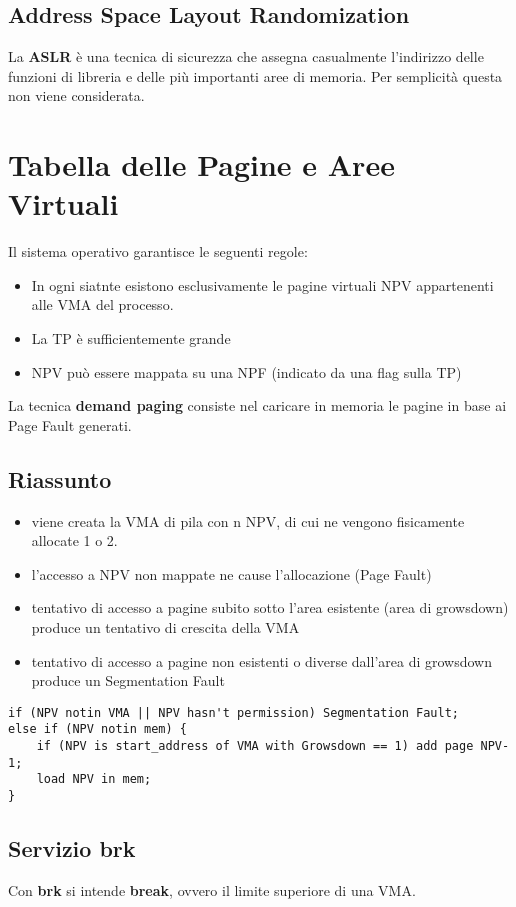 \documentclass[12pt, a4paper]{report}
\begin{document}
\subsection{Address Space Layout Randomization}
La \textbf{ASLR} è una tecnica di sicurezza che assegna casualmente l'indirizzo
delle funzioni di libreria e delle più importanti aree di memoria. Per
semplicità questa non viene considerata.

\section{Tabella delle Pagine e Aree Virtuali}
Il sistema operativo garantisce le seguenti regole:
\begin{itemize}
	\item In ogni siatnte esistono esclusivamente le pagine virtuali NPV
		appartenenti alle VMA del processo.
	\item La TP è sufficientemente grande
	\item NPV può essere mappata su una NPF (indicato da una flag sulla TP)
\end{itemize}
La tecnica \textbf{demand paging} consiste nel caricare in memoria le pagine in
base ai Page Fault generati.
\subsection{Riassunto}
\begin{itemize}
	\item viene creata la VMA di pila con n NPV, di cui ne vengono fisicamente
		allocate 1 o 2.
	\item l'accesso a NPV non mappate ne cause l'allocazione (Page Fault)
	\item tentativo di accesso a pagine subito sotto l'area esistente (area di
		growsdown) produce un tentativo di crescita della VMA
	\item tentativo di accesso a pagine non esistenti o diverse dall'area di
		growsdown produce un Segmentation Fault
\end{itemize}

\begin{verbatim}
if (NPV notin VMA || NPV hasn't permission) Segmentation Fault;
else if (NPV notin mem) {
    if (NPV is start_address of VMA with Growsdown == 1) add page NPV-1;
    load NPV in mem;
}
\end{verbatim}
\subsection{Servizio brk}
Con \textbf{brk} si intende \textbf{break}, ovvero il limite superiore di una
VMA.
\end{document}
